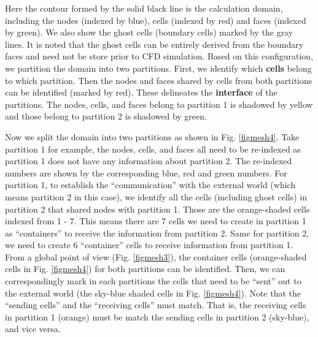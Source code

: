 \documentclass[12pt, letterpaper]{report}
\begin{document}
Here the contour formed by the solid black line is the calculation domain, including the nodes
(indexed by blue), cells (indexed by red) and faces (indexed by green). We also show the ghost cells
(boundary cells) marked by the gray lines. It is noted that the ghost cells can be entirely derived
from the boundary faces and need not be store prior to CFD simulation. Based on this configuration,
we partition the domain into two partitions. First, we identify which {\bf cells} belong to which
partition. Then the nodes and faces shared by cells from both partitions can be identified (marked
by red). These delineates the {\bf interface} of the partitions. The nodes, cells, and faces belong
to partition 1 is shadowed by yellow and those belong to partition 2 is shadowed by green.
\paraspace

Now we split the domain into two partitions as shown in Fig. \ref{figmesh4}. Take partition 1 for
example, the nodes, cells, and faces all need to be re-indexed as partition 1 does not have any
information about partition 2. The re-indexed numbers are shown by the corresponding blue, red and
green numbers. For partition 1, to establish the ``communication'' with the external world (which
means partition 2 in this case), we identify all the cells (including ghost cells) in partition 2
that shared nodes with partition 1. Those are the orange-shaded cells indexed from 1 - 7. This means
there are 7 cells we need to create in partition 1 as ``containers'' to receive the information from
partition 2. Same for partition 2, we need to create 6 ``container'' cells to receive information
from partition 1. From a global point of view (Fig. \ref{figmesh3}), the container cells
(orange-shaded cells in Fig. \ref{figmesh4}) for both partitions can be identified. Then, we can
correspondingly mark in each partitions the cells that need to be ``sent'' out to the external
world (the sky-blue shaded cells in Fig. \ref{figmesh4}). Note that the ``sending cells'' and the
``receiving cells'' must match. That is, the receiving cells in partition 1 (orange) must be match
the sending cells in partition 2 (sky-blue), and vice versa.
\end{document}
